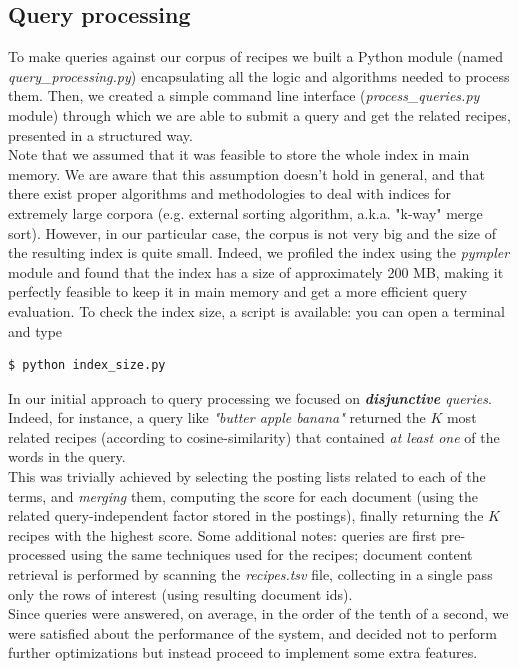 \subsection{Query processing}

To make queries against our corpus of recipes we built a Python module (named \textit{query\_processing.py}) encapsulating all the logic and algorithms needed to process them. Then, we created a simple command line interface (\textit{process\_queries.py} module) through which we are able to submit a query and get the related recipes, presented in a structured way.\\
Note that we assumed that it was feasible to store the whole index in main memory. We are aware that this assumption doesn't hold in general, and that there exist proper algorithms and methodologies to deal with indices for extremely large corpora (e.g. external sorting algorithm, a.k.a. "k-way" merge sort). However, in our particular case, the corpus is not very big and the size of the resulting index is quite small. Indeed, we profiled the index using the \textit{pympler}\cite{pympler} module and found that the index has a size of approximately 200 MB, making it perfectly feasible to keep it in main memory and get a more efficient query evaluation. To check the index size, a script is available: you can open a terminal and type
\begin{lstlisting}
$ python index_size.py
\end{lstlisting}
In our initial approach to query processing we focused on \textit{\textbf{disjunctive} queries}. Indeed, for instance, a query like \textit{"butter apple banana"} returned the $K$ most related recipes (according to cosine-similarity) that contained \textit{at least one} of the words in the query. \\
This was trivially achieved by selecting the posting lists related to each of the terms, and \textit{merging} them, computing the score for each document (using the related query-independent factor stored in the postings), finally returning the $K$ recipes with the highest score. Some additional notes: queries are first pre-processed using the same techniques used for the recipes; document content retrieval is performed by scanning the \textit{recipes.tsv} file, collecting in a single pass only the rows of interest (using resulting document ids).\\
Since queries were answered, on average, in the order of the tenth of a second, we were satisfied about the performance of the system, and decided not to perform further optimizations but instead proceed to implement some extra features.


